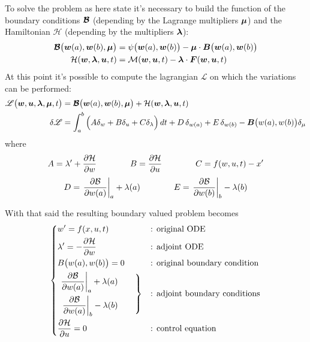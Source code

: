 	To solve the problem as here state it's necessary to build the function of the boundary conditions $\boldsymbol{\mathcal B}$ (depending by the Lagrange multipliers $\boldsymbol{\mu}$) and the Hamiltonian $\mathcal H$ (depending by the multipliers $\boldsymbol{\lambda}$):
	\begin{equation}
		\begin{split}
			\boldsymbol{\mathcal B}\big(\boldsymbol{w}(a),\boldsymbol{w}(b),\boldsymbol{\mu}\big) & = \psi\big(\boldsymbol{w}(a),\boldsymbol{w}(b)\big) - \boldsymbol{\mu}\cdot \boldsymbol{B}\big( \boldsymbol{w}(a),\boldsymbol{w}(b) \big) \\
			\mathcal H(\boldsymbol{w},\boldsymbol{\lambda},\boldsymbol{u},t) & = \mathcal M(\boldsymbol{w}, \boldsymbol{u},t) - \boldsymbol{\lambda} \cdot \boldsymbol{F}(\boldsymbol{w},\boldsymbol{u}, t)
		\end{split}
	\end{equation}
	At this point it's possible to compute the lagrangian $\mathscr L$ on which the variations can be performed:
	\begin{equation}
		\begin{split}
			\mathscr L\big( \boldsymbol{w},\boldsymbol{u},\boldsymbol{\lambda}, \boldsymbol{\mu} ,t \big) & = \boldsymbol{\mathcal B}\big(\boldsymbol{w}(a),\boldsymbol{w}(b),\boldsymbol{\mu}\big) + \mathcal H(\boldsymbol{w},\boldsymbol{\lambda},\boldsymbol{u},t) \\
			\delta \mathscr L & = \int_a^b \Big( A \delta_w + B \delta_u + C \delta_\lambda \Big)\, dt + D \, \delta_{w(a)} + E \, \delta_{w(b)} - \boldsymbol{B} \big(w(a),w(b)\big) \delta_\mu
		\end{split}
	\end{equation}
	where
	\[ A = \lambda' + \frac{\partial \mathcal H}{\partial w} \qquad \qquad B = \frac{\partial \mathcal H}{\partial u} \qquad \qquad C = f(w,u,t) - x' \] \[  D = \left.\frac{\partial \mathcal B}{\partial w(a)}\right|_{a}+ \lambda(a) \qquad \qquad E = \left.\frac{\partial \mathcal B}{\partial w(b)}\right|_{b} -\lambda(b) \]
	
	With that said the resulting boundary valued problem becomes
	\begin{equation} \label{eq:opt:generalsolution}
		\left\{ \begin{aligned}
			&w' = f(x,u,t) && \textrm{: original ODE} \\
			&\lambda' = - \frac{\partial \mathcal H}{\partial w} && \textrm{: adjoint ODE} \\
			&B\big(w(a),w(b)\big) = 0 && \textrm{: original boundary condition} \\
			&\left. \begin{aligned}
				 \left.\frac{\partial \mathcal B}{\partial w(a)}\right|_{a}+ \lambda(a) \\
				  \left.\frac{\partial \mathcal B}{\partial w(a)}\right|_{b} - \lambda(b)
			\end{aligned} \qquad \right\} &&\textrm{: adjoint boundary conditions} \\
			& \frac{\partial \mathcal H}{\partial u} = 0 && \textrm{: control equation}
		\end{aligned} \right. 
	\end{equation}
	
